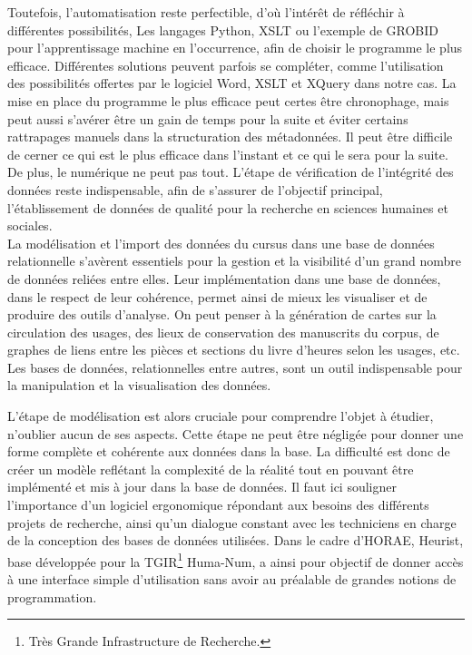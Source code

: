 \documentclass[a4paper,12pt,twoside]{book}
\begin{document}
	Toutefois, l'automatisation reste perfectible, d'où l'intérêt de réfléchir à différentes possibilités, Les langages Python, XSLT ou l'exemple de GROBID pour l'apprentissage machine en l'occurrence, afin de choisir le programme le plus efficace. Différentes solutions peuvent parfois se compléter, comme l'utilisation des possibilités offertes par le logiciel Word, XSLT et XQuery dans notre cas. La mise en place du programme le plus efficace peut certes être chronophage, mais peut aussi s'avérer être un gain de temps pour la suite et éviter certains rattrapages manuels dans la structuration des métadonnées. Il peut être difficile de cerner ce qui est le plus efficace dans l'instant et ce qui le sera pour la suite. De plus, le numérique ne peut pas tout. L'étape de vérification de l'intégrité des données reste indispensable, afin de s'assurer de l'objectif principal, l'établissement de données de qualité pour la recherche en sciences humaines et sociales. \\
	
	La modélisation et l'import des données du cursus dans une base de données relationnelle s'avèrent essentiels pour la gestion et la visibilité d'un grand nombre de données reliées entre elles. Leur implémentation dans une base de données, dans le respect de leur cohérence, permet ainsi de mieux les visualiser et de produire des outils d'analyse. On peut penser à la génération de cartes sur la circulation des usages, des lieux de conservation des manuscrits du corpus, de graphes de liens entre les pièces et sections du livre d'heures selon les usages, etc. Les bases de données, relationnelles entre autres, sont un outil indispensable pour la manipulation et la visualisation des données. 
	
	L'étape de modélisation est alors cruciale pour comprendre l'objet à étudier, n'oublier aucun de ses aspects. Cette étape ne peut être négligée pour donner une forme complète et cohérente aux données dans la base. La difficulté est donc de créer un modèle reflétant la complexité de la réalité tout en pouvant être implémenté et mis à jour dans la base de données. Il faut ici souligner l'importance d'un logiciel ergonomique répondant aux besoins des différents projets de recherche, ainsi qu'un dialogue constant avec les techniciens en charge de la conception des bases de données utilisées. Dans le cadre d'HORAE, Heurist, base développée pour la TGIR\footnote{Très Grande Infrastructure de Recherche.} Huma-Num, a ainsi pour objectif de donner accès à une interface simple d'utilisation sans avoir au préalable de grandes notions de programmation. \\
	
\end{document}

